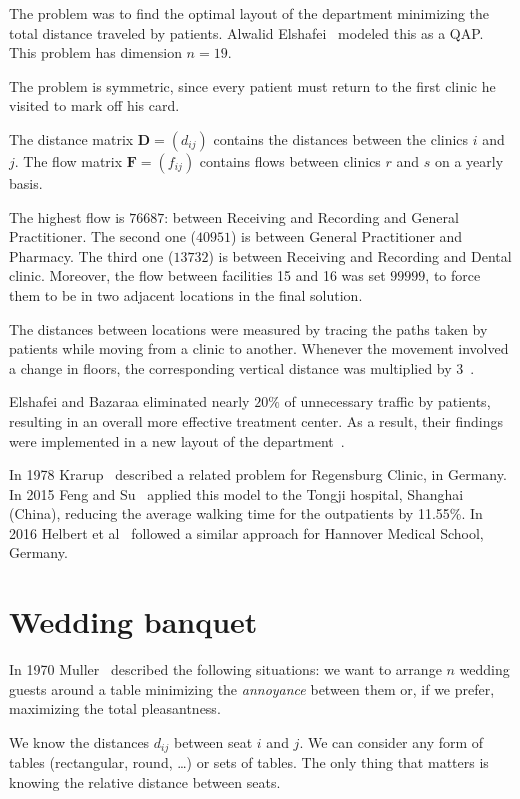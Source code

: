  The problem was to find the optimal layout of the department minimizing the total distance traveled by patients. Alwalid Elshafei~\cite{Elshafei_1977} modeled this  as a QAP. This problem has dimension $n=19$. 


The problem is symmetric, since every patient must return to the first clinic he visited to mark off his card. 

The distance matrix $\bm D= (d_{ij})$ contains the distances between the clinics $i$ and $j$.
The flow matrix $\bm F= (f_{ij})$ contains flows between clinics $r$ and $s$ on a yearly basis. 

The highest flow is $76687$: between Receiving and Recording and General Practitioner. The second one ($40951$) is between General Practitioner and Pharmacy. The third one ($13732$) is between Receiving and Recording and Dental clinic. Moreover, the flow between facilities 15 and 16 was set $99999$, to force them to be in two adjacent locations in the final solution.

The distances between locations were measured by tracing the paths taken by patients while moving from a clinic to another. Whenever the movement involved a change in floors, the corresponding vertical distance was multiplied by $3$~\cite{Elshafei_1977}.


Elshafei and Bazaraa eliminated nearly $20\%$ of unnecessary traffic by patients, resulting in an overall more effective treatment center. As a result, their findings were implemented in a new layout of the department~\cite{Elshafei_1977}.

In 1978 Krarup~\cite{Krarup1978} described a related problem for Regensburg Clinic, in Germany. In 2015 Feng and Su~\cite{Feng2015} applied this model to the Tongji hospital, Shanghai (China), reducing the average walking time for the outpatients by \num{11.55}\%. In 2016 Helbert et al~\cite{Helber2015} followed a similar approach for Hannover Medical School, Germany.

\section{Wedding banquet}
\label{sec:Wedding_banquet}

In 1970 Muller~\cite{MuellerMerbach1970} described the following situations: we want to arrange $n$  wedding guests around a table minimizing the \textit{annoyance} between them or, if we prefer, maximizing the total pleasantness. 

We know the distances $d_{ij}$ between seat $i$ and $j$. We can consider any form of tables (rectangular, round, \dots) or sets of tables. The only thing that matters is knowing the relative distance between seats.



